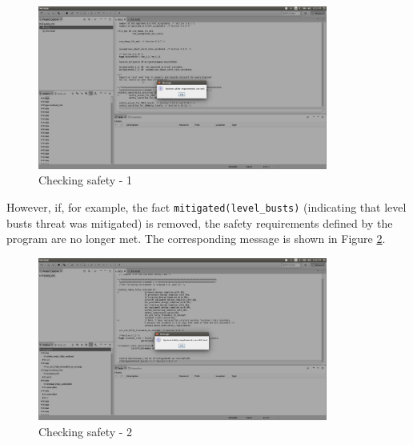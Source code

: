 \documentclass[a4paper,10pt]{article}
\begin{document}
\begin{figure}[H]
\centering
\includegraphics[width=0.85\textwidth]{12}
\caption{Checking safety - 1}\label{fig12}
\end{figure}

\noindent
However, if, for example, the fact \texttt{mitigated(level\_busts)} (indicating that level busts threat was mitigated) is removed, the safety requirements defined by the program are no longer met. The corresponding message is shown in Figure \ref{fig13}.

 
\begin{figure}[H]
\centering
\includegraphics[width=0.85\textwidth]{13}
\caption{Checking safety - 2}\label{fig13}
\end{figure}
\end{document}
